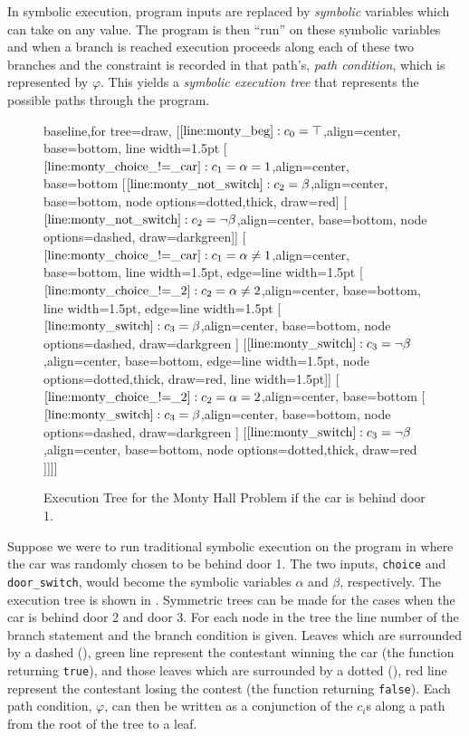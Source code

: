 \documentclass[acmsmall,review,anonymous]{acmart}\settopmatter{printfolios=true,printccs=false,printacmref=false}
\begin{document}
In symbolic execution, program inputs are replaced by \textit{symbolic} variables which can take on any value.
% 
The program is then ``run'' on these symbolic variables and when a branch is reached execution proceeds along each of these two branches and the constraint is recorded in that path's, \textit{path condition}, which is represented by $\varphi$.
% 
This yields a \textit{symbolic execution tree} that represents the possible paths through the program.
\begin{figure}
	\centering
	{\footnotesize
		\begin{forest}baseline,for tree=draw,
			[{$\mathtt{\ref{line:monty_beg}}: c_0=\top$},align=center, base=bottom, line width=1.5pt
			[{$\mathtt{\ref{line:monty_choice_!=_car}}: c_1 = \alpha = 1$},align=center, base=bottom
			[{$\mathtt{\ref{line:monty_not_switch}}: c_2 = \beta$},align=center, base=bottom, node options={dotted,thick}, draw=red] %
			[{$\mathtt{\ref{line:monty_not_switch}}: c_2 = \neg\beta$},align=center, base=bottom, node options={dashed}, draw=darkgreen]] %
			[{$\mathtt{\ref{line:monty_choice_!=_car}}: c_1 = \alpha \neq 1$},align=center, base=bottom, line width=1.5pt, edge={line width=1.5pt}
			[{$\mathtt{\ref{line:monty_choice_!=_2}}: c_2 = \alpha \neq 2$},align=center, base=bottom, line width=1.5pt, edge={line width=1.5pt}
			[{$\mathtt{\ref{line:monty_switch}}: c_3 = \beta$},align=center, base=bottom, node options={dashed}, draw=darkgreen ] %
			[{$\mathtt{\ref{line:monty_switch}}: c_3 = \neg\beta$},align=center, base=bottom, edge={line width=1.5pt}, node options={dotted,thick}, draw=red, line width=1.5pt]] %
			[{$\mathtt{\ref{line:monty_choice_!=_2}}: c_2 = \alpha = 2$},align=center, base=bottom
			[{$\mathtt{\ref{line:monty_switch}}: c_3 = \beta$},align=center, base=bottom, node options={dashed}, draw=darkgreen ] %
			[{$\mathtt{\ref{line:monty_switch}}: c_3 = \neg\beta$},align=center, base=bottom, node options={dotted,thick}, draw=red ]]]] %
		\end{forest}
	}
	\caption{Execution Tree for the Monty Hall Problem if the car is behind door 1.}
	\label{fig:montyhall_tree}
\end{figure}
Suppose we were to run traditional symbolic execution on the program in  where the car was randomly chosen to be behind door 1.
% 
The two inputs, \texttt{choice} and \texttt{door\_switch}, would become the symbolic variables $\alpha$ and $\beta$, respectively.
% 
The execution tree is shown in .
% 
Symmetric trees can be made for the cases when the car is behind door 2 and door 3.
% 
For each node in the tree the line number of the branch statement and the branch condition is given.
% 
Leaves which are surrounded by a dashed (), {\color{darkgreen} green} line represent the contestant winning the car (the function returning \texttt{true}), and those leaves which are surrounded by a dotted (), {\color{red} red} line represent the contestant losing the contest (the function returning \texttt{false}).
% 
Each path condition, $\varphi$, can then be written as a conjunction of the $c_i$s along a path from the root of the tree to a leaf.
\end{document}
